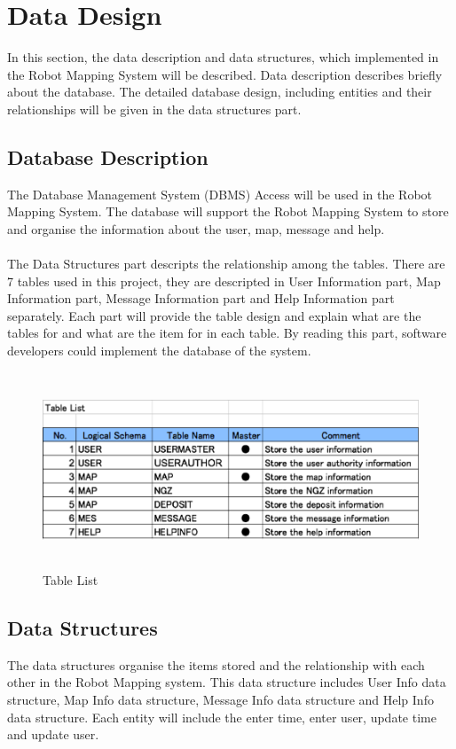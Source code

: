 \documentclass[11pt, a4paper]{article}
\begin{document}
\section{Data Design}
In this section, the data description and data structures, which implemented in the Robot Mapping System will be described. Data description describes briefly about the database. The detailed database design, including entities and their relationships will be given in the data structures part.

\subsection{Database Description}
The Database Management System (DBMS) Access will be used in the Robot Mapping System. The database will support the Robot Mapping System to store and organise the information about the user, map, message and help. \\
\\
The Data Structures part descripts the relationship among the tables. There are 7 tables used in this project, they are descripted in User Information part, Map Information part, Message Information part and Help Information part separately. Each part will provide the table design and explain what are the tables for and what are the item for in each table. By reading this part, software developers could implement the database of the system. \\

\begin{figure}[H]
\centering
\includegraphics[height=2.3in]{TL}
\caption[Table List]{Table List}
\end{figure}
\newpage

\subsection{Data Structures}
The data structures organise the items stored and the relationship with each other in the Robot Mapping system. This data structure includes User Info data structure, Map Info data structure, Message Info data structure and Help Info data structure. Each entity will include the enter time, enter user, update time and update user.
\end{document}
